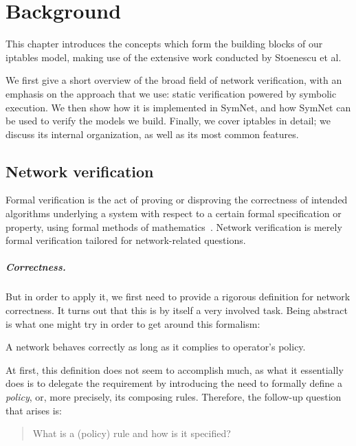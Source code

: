 \chapter{Background}\label{chapter:background}

This chapter introduces the concepts which form the building blocks of our
iptables model, making use of the extensive work conducted by Stoenescu et
al.~\cite{stoenescu2013symnet, stoenescu2016symnet}

We first give a short overview of the broad field of network verification, with
an emphasis on the approach that we use: static verification powered by
symbolic execution.  We then show how it is implemented in SymNet, and how
SymNet can be used to verify the models we build.  Finally, we cover iptables
in detail; we discuss its internal organization, as well as its most common
features.


\section{Network verification}\label{sec:network-verification}
Formal verification is the act of proving or disproving the correctness of
intended algorithms underlying a system with respect to a certain formal
specification or property, using formal methods of
mathematics~\cite{sanghavi2010formal}. Network verification is merely formal
verification tailored for network-related questions.

\paragraph{Correctness.}\label{par:correctness}
But in order to apply it, we first need to provide a rigorous definition for
network correctness.  It turns out that this is by itself a very involved task.
Being abstract is what one might try in order to get around this formalism:

\begin{definition}
\label{def:full-correctness}
A network behaves correctly as long as it complies to operator's policy.
\end{definition}

At first, this definition does not seem to accomplish much, as what it
essentially does is to delegate the requirement by introducing the need to
formally define a \emph{policy}, or, more precisely, its composing rules.
Therefore, the follow-up question that arises is:

\begin{quote}
What is a (policy) rule and how is it specified?
\end{quote}

